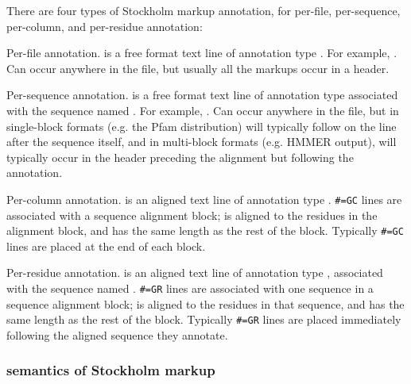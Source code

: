 There are four types of Stockholm markup annotation, for per-file,
per-sequence, per-column, and per-residue annotation:

\begin{wideitem}
\item [\emprog{\#=GF <tag> <s>}]
        Per-file annotation.  is a free format text line
        of annotation type . For example, . Can occur anywhere in the file, but usually
        all the  markups occur in a header.

\item [\emprog{\#=GS <seqname> <tag> <s>}]
        Per-sequence annotation.  is a free format text line
        of annotation type  associated with the sequence
        named . For example, . Can occur anywhere
        in the file, but in single-block formats (e.g. the Pfam
        distribution) will typically follow on the line after the
        sequence itself, and in multi-block formats (e.g. HMMER
        output), will typically occur in the header preceding the
        alignment but following the  annotation.

\item [\emprog{\#=GC <tag> <...s...>}]
        Per-column annotation.  is an aligned text line
        of annotation type .
        \verb+#=GC+ lines are
        associated with a sequence alignment block; 
        is aligned to the residues in the alignment block, and has
        the same length as the rest of the block.
        Typically \verb+#=GC+ lines are placed at the end of each block.

\item [\emprog{\#=GR <seqname> <tag> <.....s.....>}]
        Per-residue annotation.  is an aligned text line
        of annotation type , associated with the sequence
        named . 
        \verb+#=GR+ lines are 
        associated with one sequence in a sequence alignment block; 
        is aligned to the residues in that sequence, and has
        the same length as the rest of the block.
        Typically
        \verb+#=GR+ lines are placed immediately following the
        aligned sequence they annotate.
\end{wideitem}

\subsubsection{semantics of Stockholm markup}

